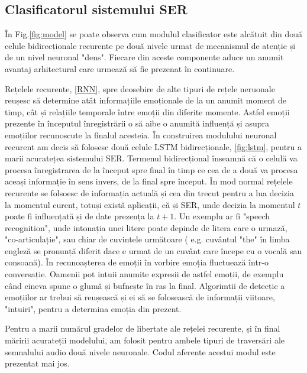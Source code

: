 \documentclass[a4paper,12pt]{book}
\begin{document}
			\subsection{Clasificatorul sistemului SER} \label{clasif_prac}
				În Fig.\ref{fig:model} se poate observa cum modulul clasificator este alcătuit din două celule bidirecționale recurente pe două nivele urmat de mecanismul de atenție și de un nivel neuronal "dens". Fiecare din aceste componente aduce un anumit avantaj arhitectural care urmează să fie prezenat în continuare. \par 
				Rețelele recurente, \ref{RNN}, spre deosebire de alte tipuri de rețele neruonale reușesc să determine atât informațiile emoționale de la un anumit moment de timp, cât  și relațiile temporale între emoții din diferite momente. Astfel emoții prezente în începutul înregistrării o să aibe o anumită influență și asupra emoțiilor recunoscute la finalul acesteia. În construirea modulului neuronal recurent am decis să folosesc două celule LSTM bidirecționale, \ref{fig:lstm}, pentru a marii acuratețea sistemului SER. Termenul bidirecțional înseamnă că o celulă va procesa înregistrarea de la început spre final în timp ce cea de a două va procesa aceași informație în sens invers, de la final spre început. În mod normal rețelele recurente se folsoesc de informația actuală și cea din trecut pentru a lua decizia la momentul curent, totuși există aplicații, că și SER, unde decizia la momentul $t$ poate fi influențată și de date prezența la $t+1$. Un exemplu ar fi "speech recognition", unde intonația unei litere poate depinde de litera care o urmază, "co-articulație", sau chiar de cuvintele următoare ( e.g. cuvântul "the" în limba engleză se pronunță diferit dace e urmat de un cuvânt care începe cu o vocală sau consoană). În recunoașterea de emoții în vorbire emoția fluctuează într-o conversație. Oamenii pot intuii anumite expresii de astfel emoții, de exemplu când cineva spune o glumă și bufnește în ras la final. Algorimtii de detecție a emoțiilor ar trebui să reușească și ei să se folosească de informații viitoare, "intuiri", pentru a determina emoția din prezent. \par Pentru a marii numărul gradelor de libertate ale rețelei recurente, și în final măririi acurateții modelului, am folosit pentru ambele tipuri de traversări ale semnalului audio două nivele neuronale. Codul aferente acestui modul este prezentat mai jos.\par 
\end{document}
